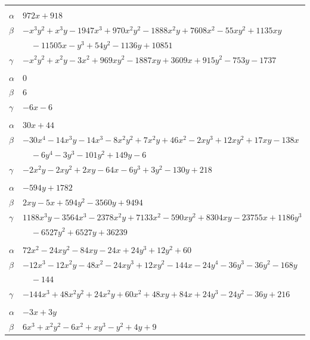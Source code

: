 \documentclass[11pt]{article}
\begin{document}
\begin{longtable}{@{}ll@{}}
\addlinespace[3pt]
\multicolumn{2}{@{}l}{$\{i,j\}=\{73,79\}$, $k_{ij}=2^{2}\cdot 3^{3}\cdot 7^{3}$}\\
$\alpha$ & $972x+918$\\
$\beta$ & $-x^{3}y^{2}+x^{3}y-1947x^{3}+970x^{2}y^{2}-1888x^{2}y+7608x^{2}-55xy^{2}+1135xy$\\
 & $\quad -11505x-y^{3}+54y^{2}-1136y+10851$\\
$\gamma$ & $-x^{2}y^{2}+x^{2}y-3x^{2}+969xy^{2}-1887xy+3609x+915y^{2}-753y-1737$\\
\addlinespace[3pt]
\multicolumn{2}{@{}l}{$\{i,j\}=\{73,81\}$, $k_{ij}=2\cdot 3$}\\
$\alpha$ & $0$\\
$\beta$ & $6$\\
$\gamma$ & $-6x-6$\\
\addlinespace[3pt]
\multicolumn{2}{@{}l}{$\{i,j\}=\{75,76\}$, $k_{ij}=2\cdot 13^{2}$}\\
$\alpha$ & $30x+44$\\
$\beta$ & $-30x^{4}-14x^{3}y-14x^{3}-8x^{2}y^{2}+7x^{2}y+46x^{2}-2xy^{3}+12xy^{2}+17xy-138x$\\
 & $\quad -6y^{4}-3y^{3}-101y^{2}+149y-6$\\
$\gamma$ & $-2x^{2}y-2xy^{2}+2xy-64x-6y^{3}+3y^{2}-130y+218$\\
\addlinespace[3pt]
\multicolumn{2}{@{}l}{$\{i,j\}=\{76,81\}$, $k_{ij}=2\cdot 3^{4}\cdot 7^{2}\cdot 11$}\\
$\alpha$ & $-594y+1782$\\
$\beta$ & $2xy-5x+594y^{2}-3560y+9494$\\
$\gamma$ & $1188x^{3}y-3564x^{3}-2378x^{2}y+7133x^{2}-590xy^{2}+8304xy-23755x+1186y^{3}$\\
 & $\quad -6527y^{2}+6527y+36239$\\
\addlinespace[3pt]
\multicolumn{2}{@{}l}{$\{i,j\}=\{76,124\}$, $k_{ij}=2^{2}\cdot 3^{2}\cdot 7$}\\
$\alpha$ & $72x^{2}-24xy^{2}-84xy-24x+24y^{3}+12y^{2}+60$\\
$\beta$ & $-12x^{3}-12x^{2}y-48x^{2}-24xy^{3}+12xy^{2}-144x-24y^{4}-36y^{3}-36y^{2}-168y$\\
 & $\quad -144$\\
$\gamma$ & $-144x^{3}+48x^{2}y^{2}+24x^{2}y+60x^{2}+48xy+84x+24y^{3}-24y^{2}-36y+216$\\
\addlinespace[3pt]
\multicolumn{2}{@{}l}{$\{i,j\}=\{76,125\}$, $k_{ij}=3^{2}$}\\
$\alpha$ & $-3x+3y$\\
$\beta$ & $6x^{3}+x^{2}y^{2}-6x^{2}+xy^{3}-y^{2}+4y+9$\\

\end{longtable}
\end{document}
